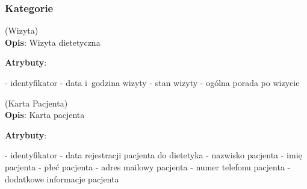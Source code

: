 \subsubsection{Kategorie}\label{subsubsec:database:appointments:categories}
\begin{enumerate}[label={\textbf{KAT/5/\protect\twodigits{\theenumi}}}, wide, labelwidth=!, labelindent=0pt, labelsep=0pt, series=reqs]
    \setlength\itemsep{1.75em}
    \label{kat:Appointment} (Wizyta)\\
    \indent\textbf{Opis}: Wizyta dietetyczna
    \par
    \textbf{Atrybuty}:
    \begin{itemize}[series=atr, wide, align=left, leftmargin=190pt]
        \label{kat:Appointment:id}- identyfikator
        \label{kat:Appointment:appointmentDate}- data i~godzina wizyty
        \label{kat:Appointment:appointmentState}- stan wizyty
        \label{kat:Appointment:generalAdvice}- ogólna porada po wizycie
    \end{itemize}

    \label{kat:PatientCard} (Karta Pacjenta)\\
    \indent\textbf{Opis}: Karta pacjenta
    \par
    \textbf{Atrybuty}:
    \begin{itemize}[series=atr, wide, align=left, leftmargin=190pt]
        \label{kat:PatientCard:id}- identyfikator
        \label{kat:PatientCard:creationDate}- data rejestracji pacjenta do dietetyka
        \label{kat:PatientCard:patientLastName}- nazwisko pacjenta
        \label{kat:PatientCard:patientFirstName}- imię pacjenta
        \label{kat:PatientCard:patientGender}- płeć pacjenta
        \label{kat:PatientCard:patientEmail}- adres mailowy pacjenta
        \label{kat:PatientCard:patientPhone}- numer telefonu pacjenta
        \label{kat:PatientCard:additionalPatientInfo}- dodatkowe informacje pacjenta
    \end{itemize}


\end{enumerate}
